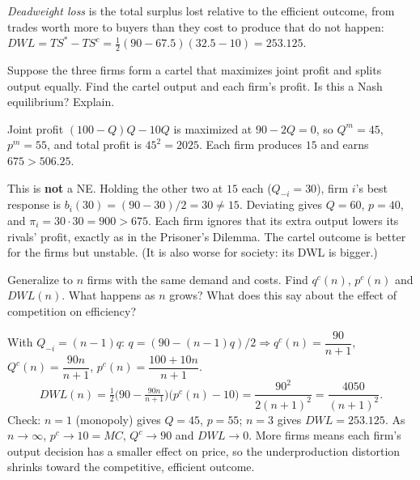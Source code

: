 \begin{description}
\begin{solution}
\emph{Deadweight loss} is the total surplus lost relative to the efficient outcome, from trades worth more to buyers than they cost to produce that do not happen: $DWL=TS^*-TS^c=\tfrac12(90-67.5)(32.5-10)=253.125$.
\begin{center}
\end{center}
\end{solution}
\item[4.6] Suppose the three firms form a cartel that maximizes joint profit and splits output equally. Find the cartel output and each firm's profit. Is this a Nash equilibrium? Explain.
\begin{solution}
Joint profit $(100-Q)Q-10Q$ is maximized at $90-2Q=0$, so $Q^m=45$, $p^m=55$, and total profit is $45^2=2025$. Each firm produces $15$ and earns $675>506.25$.

This is \textbf{not} a NE. Holding the other two at $15$ each ($Q_{-i}=30$), firm $i$'s best response is $b_i(30)=(90-30)/2=30\ne15$. Deviating gives $Q=60$, $p=40$, and $\pi_i=30\cdot30=900>675$. Each firm ignores that its extra output lowers its rivals' profit, exactly as in the Prisoner's Dilemma. The cartel outcome is better for the firms but unstable. (It is also worse for society: its DWL is bigger.)
\end{solution}
\item[4.7] Generalize to $n$ firms with the same demand and costs. Find $q^c(n)$, $p^c(n)$ and $DWL(n)$. What happens as $n$ grows? What does this say about the effect of competition on efficiency?
\begin{solution}
With $Q_{-i}=(n-1)q$: $q=(90-(n-1)q)/2\Rightarrow q^c(n)=\dfrac{90}{n+1}$, $Q^c(n)=\dfrac{90n}{n+1}$, $p^c(n)=\dfrac{100+10n}{n+1}$.
\[DWL(n)=\tfrac12\Big(90-\tfrac{90n}{n+1}\Big)\Big(p^c(n)-10\Big)=\frac{90^2}{2(n+1)^2}=\frac{4050}{(n+1)^2}.\]
Check: $n=1$ (monopoly) gives $Q=45$, $p=55$; $n=3$ gives $DWL=253.125$. As $n\to\infty$, $p^c\to10=MC$, $Q^c\to90$ and $DWL\to0$. More firms means each firm's output decision has a smaller effect on price, so the underproduction distortion shrinks toward the competitive, efficient outcome.
\end{solution}
\end{description}

